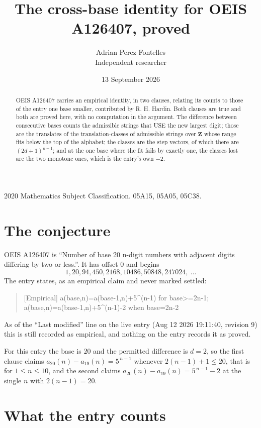 \documentclass[11pt,a4paper]{article}
\title{The cross-base identity for OEIS A126407, proved}
\author{Adrian Perez Fontelles\\ \small Independent researcher}
\date{13 September 2026}
\theoremstyle{plain}
\theoremstyle{definition}
\begin{document}
\maketitle

\begin{abstract}
OEIS A126407 carries an empirical identity, in two clauses, relating its counts to those of the
entry one base smaller, contributed by R. H. Hardin. Both clauses are true and both are proved
here, with no computation in the argument. The difference between consecutive bases counts the
admissible strings that USE the new largest digit; those are the translates of the
translation-classes of admissible strings over $\mathbf{Z}$ whose range fits below the top of
the alphabet; the classes are the step vectors, of which there are $(2d+1)^{n-1}$; and at the
one base where the fit fails by exactly one, the classes lost are the two monotone ones, which
is the entry's own $-2$.
\end{abstract}

\noindent\small 2020 Mathematics Subject Classification. 05A15, 05A05, 05C38.\normalsize

\section{The conjecture}

OEIS A126407 is ``Number of base 20 n-digit numbers with adjacent digits differing by two or less.''. It has offset $0$ and begins
\[
1, 20, 94, 450, 2168, 10486, 50848, 247024,\ \dots
\]
The entry states, as an empirical claim and never marked settled:
\begin{quote}
[Empirical] a(base,n)=a(base-1,n)+5\textasciicircum{}(n-1) for base>=2n-1; a(base,n)=a(base-1,n)+5\textasciicircum{}(n-1)-2 when base=2n-2
\end{quote}
As of the ``Last modified'' line on the live entry (Aug 12 2026 19:11:40, revision 9)
this is still recorded as empirical, and nothing on the entry records it as proved.

For this entry the base is $20$ and the permitted difference is $d=2$, so the first clause
claims $a_{20}(n)-a_{19}(n)=5^{\,n-1}$ whenever $2(n-1)+1\le20$, that is for
$1\le n\le10$, and the second claims $a_{20}(n)-a_{19}(n)=5^{\,n-1}-2$ at the single
$n$ with $2(n-1)=20$.

\section{What the entry counts}
\end{document}

